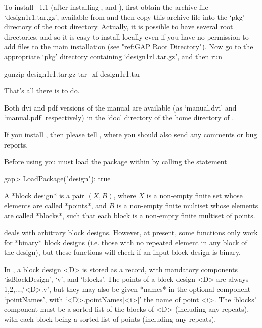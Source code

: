 To install {\DESIGN}~1.1 (after installing {\GAP}, {\GRAPE} and
{\GAPDoc}), first obtain the {\DESIGN} archive file `design1r1.tar.gz',
available from  and 
then copy this archive file into the `pkg' directory of the {\GAP}
root directory. Actually, it is possible to have several {\GAP} root
directories, and so it is easy to install {\DESIGN} locally even if you
have no permission to add files to the main {\GAP} installation (see
"ref:GAP Root Directory").  Now go to the appropriate `pkg' directory
containing `design1r1.tar.gz', and then run

\begintt
gunzip design1r1.tar.gz
tar -xf design1r1.tar
\endtt

That's all there is to do.

Both dvi and pdf versions of the {\DESIGN} manual are available
(as `manual.dvi' and `manual.pdf' respectively) in the `doc' directory
of the home directory of {\DESIGN}.

If you install {\DESIGN}, then please tell
, where you should also send any comments
or bug reports.


Before using {\DESIGN} you must load the package within {\GAP} by calling 
the statement

\begintt
gap> LoadPackage("design");
true
\endtt


A *block design* is a pair $(X,B)$, where $X$ is a non-empty finite
set whose elements are called *points*, and $B$ is a non-empty finite
multiset whose elements are called *blocks*, such that each block   
is a non-empty finite multiset of points.
  
{\DESIGN} deals with arbitrary block designs. However, at present,  
some {\DESIGN} functions only work for *binary* block designs 
(i.e. those with no repeated element in any block of the design),
but these functions will check if an input block design is binary.

In {\DESIGN}, a block design <D> is stored as a record, with mandatory
components `isBlockDesign', `v', and `blocks'.  The points of a block
design <D> are always 1,2,...,`<D>.v', but they may also be given *names*
in the optional component `pointNames', with `<D>.pointNames[<i>]'
the name of point <i>.  The `blocks' component must be a sorted list
of the blocks of <D> (including any repeats), with each block being a
sorted list of points (including any repeats). 

